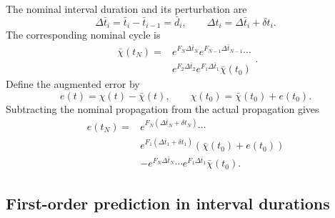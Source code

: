 \documentclass[pdflatex,iicol,sn-mathphys-ay]{sn-jnl}
\begin{document}
The nominal interval duration and its perturbation are
\begin{equation}
    \Delta\bar t_i=\bar t_i-\bar t_{i-1}=\bar d_i,
    \qquad
    \Delta t_i=\Delta\bar t_i+\delta t_i.
    \label{eq:prediction-duration-perturbation}
\end{equation}
The corresponding nominal cycle is
\begin{equation}
\boxed{\begin{aligned}
    \bar\chi(t_N)={}&e^{F_N\Delta\bar t_N}
    e^{F_{N-1}\Delta\bar t_{N-1}}\cdots\\
    &e^{F_2\Delta\bar t_2}e^{F_1\Delta\bar t_1}\bar\chi(t_0)
\end{aligned}}.
\end{equation}
Define the augmented error by
\begin{equation}
    e(t)=\chi(t)-\bar\chi(t),
    \qquad
    \chi(t_0)=\bar\chi(t_0)+e(t_0).
    \label{eq:augmented-state-error}
\end{equation}
Subtracting the nominal propagation from the actual propagation gives
\begin{equation}
\begin{split}
    e(t_N)={}&
    e^{F_N(\Delta\bar t_N+\delta t_N)}\cdots\\
    &e^{F_1(\Delta\bar t_1+\delta t_1)}
    \left(\bar\chi(t_0)+e(t_0)\right)\\
    &-e^{F_N\Delta\bar t_N}\cdots
    e^{F_1\Delta\bar t_1}\bar\chi(t_0).
\end{split}
\label{eq:exact-augmented-error}
\end{equation}

\subsection{First-order prediction in interval durations}
\end{document}
